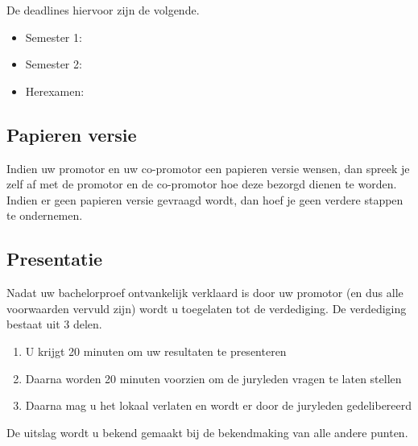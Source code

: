De deadlines hiervoor zijn de volgende. 
\begin{framed}
\begin{itemize}
	\item Semester 1: \indienenBPSemEen{}
	\item Semester 2:\indienenBPSemTwee{}
	\item Herexamen: \indienenBPderdeeEx{}
\end{itemize}
\end{framed}
\subsection{Papieren versie}
Indien uw promotor en uw co-promotor een papieren versie wensen, dan spreek je zelf af met de promotor en de co-promotor hoe deze bezorgd dienen te worden. Indien er geen papieren versie gevraagd wordt, dan hoef je geen verdere stappen te ondernemen. 

\subsection{Presentatie}
Nadat uw bachelorproef ontvankelijk verklaard is door uw promotor (en dus alle voorwaarden vervuld zijn) wordt u toegelaten tot de verdediging. De verdediging bestaat uit 3 delen.
\begin{enumerate}
	\item U krijgt 20 minuten om uw resultaten te presenteren
	\item Daarna worden 20 minuten voorzien om de juryleden vragen te laten stellen
	\item Daarna mag u het lokaal verlaten en wordt er door de juryleden gedelibereerd
\end{enumerate}
De uitslag wordt u bekend gemaakt bij de bekendmaking van alle andere punten.

